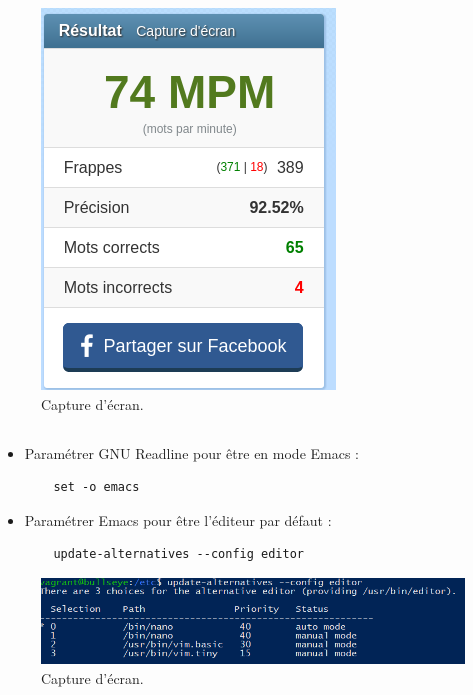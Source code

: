 \documentclass{article}
\begin{document}
\begin{figure}[h]
\centering
\includegraphics[height=\textwidth]{images/q1-2.jpg}
\caption{\label{fig:frog}Capture d'écran.}
\end{figure}
\FloatBarrier
\subsection{}

\begin{itemize}
    \item Paramétrer GNU Readline pour être en mode Emacs :
    \begin{lstlisting}
    set -o emacs
    \end{lstlisting}
    \item Paramétrer Emacs pour être l’éditeur par défaut :
    \begin{lstlisting}
    update-alternatives --config editor
    \end{lstlisting}
\end{itemize}

\begin{figure}[h]
\centering
\includegraphics[width=\textwidth]{images/q1-3.jpg}
\caption{\label{fig:frog}Capture d'écran.}
\end{figure}
\end{document}
